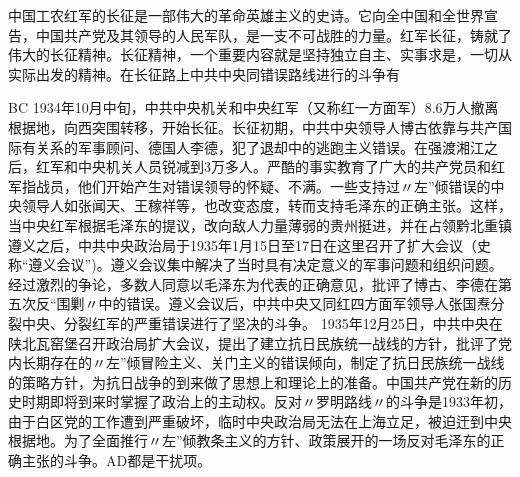 \question 中国工农红军的长征是一部伟大的革命英雄主义的史诗。它向全中国和全世界宣告，中国共产党及其领导的人民军队，是一支不可战胜的力量。红军长征，铸就了伟大的长征精神。长征精神，一个重要内容就是坚持独立自主、实事求是，一切从实际出发的精神。在长征路上中共中央同错误路线进行的斗争有
\par{}
\begin{solution}BC
1934年10月中旬，中共中央机关和中央红军（又称红一方面军）8.6万人撤离根据地，向西突围转移，开始长征。长征初期，中共中央领导人博古依靠与共产国际有关系的军事顾问、德国人李德，犯了退却中的逃跑主义错误。在强渡湘江之后，红军和中央机关人员锐减到3万多人。严酷的事实教育了广大的共产党员和红军指战员，他们开始产生对错误领导的怀疑、不满。一些支持过〃左''倾错误的中央领导人如张闻天、王稼祥等，也改变态度，转而支持毛泽东的正确主张。这样，当中央红军根据毛泽东的提议，改向敌人力量薄弱的贵州挺进，并在占领黔北重镇遵义之后，中共中央政治局于1935年1月15日至17日在这里召开了扩大会议（史称``遵义会议'')。遵义会议集中解决了当时具有决定意义的军事问题和组织问题。经过激烈的争论，多数人同意以毛泽东为代表的正确意见，批评了博古、李德在第五次反``围剿〃中的错误。遵义会议后，中共中央又同红四方面军领导人张国焘分裂中央、分裂红军的严重错误进行了坚决的斗争。
1935年12月25日，中共中央在陕北瓦窑堡召开政治局扩大会议，提出了建立抗日民族统一战线的方针，批评了党内长期存在的〃左''倾冒险主义、关门主义的错误倾向，制定了抗日民族统一战线的策略方针，为抗日战争的到来做了思想上和理论上的准备。中国共产党在新的历史时期即将到来时掌握了政治上的主动权。反对〃罗明路线〃的斗争是1933年初，由于白区党的工作遭到严重破坏，临时中央政治局无法在上海立足，被迫迀到中央根据地。为了全面推行〃左''倾教条主义的方针、政策展开的一场反对毛泽东的正确主张的斗争。AD都是干扰项。
\end{solution}
